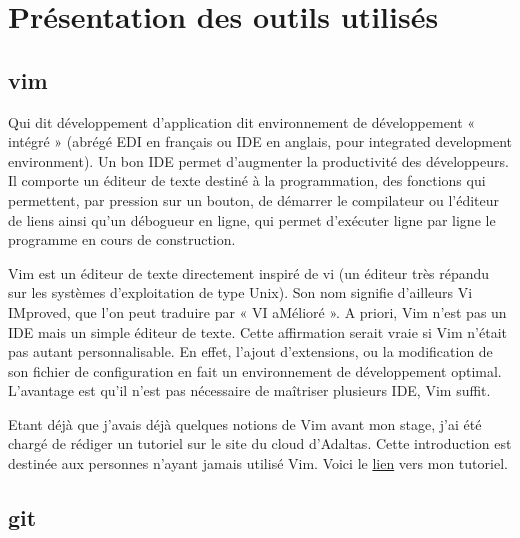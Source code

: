 \documentclass[12pt, french]{report}
\begin{document}
\section{Présentation des outils utilisés}

\subsection{vim}

Qui dit développement d'application dit environnement de développement « intégré » (abrégé EDI en français ou IDE en anglais, pour integrated development environment). Un bon IDE permet d'augmenter la productivité des développeurs. Il comporte un éditeur de texte destiné à la programmation, des fonctions qui permettent, par pression sur un bouton, de démarrer le compilateur ou l'éditeur de liens ainsi qu'un débogueur en ligne, qui permet d'exécuter ligne par ligne le programme en cours de construction.

Vim est un éditeur de texte directement inspiré de vi (un éditeur très répandu sur les systèmes d’exploitation de type Unix). Son nom signifie d’ailleurs Vi IMproved, que l’on peut traduire par « VI aMélioré ». A priori, Vim n'est pas un IDE mais un simple éditeur de texte. Cette affirmation serait vraie si Vim n'était pas autant personnalisable. En effet, l'ajout  d'extensions, ou la modification de son fichier de configuration en fait un environnement de développement optimal. L'avantage est qu'il n'est pas nécessaire de maîtriser plusieurs IDE, Vim suffit.

Etant déjà que j'avais déjà quelques notions de Vim avant mon stage, j'ai été chargé de rédiger un tutoriel sur le site du cloud d'Adaltas. Cette introduction est destinée aux personnes n'ayant jamais utilisé Vim. Voici le \href{https://www.adaltas.cloud/en/docs/foundations/vim/}{lien} vers mon tutoriel.

\subsection{git}
\end{document}

